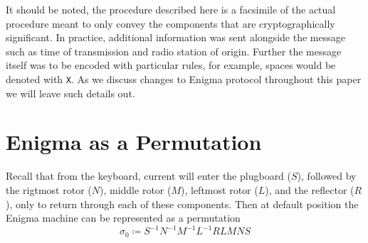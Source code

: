\noindent It should be noted, the procedure described here is a
facsimile of the actual procedure meant to only convey the components
that are cryptographically significant. In practice, additional
information was sent alongside the message such as time of
transmission and radio station of origin. Further the message itself
was to be encoded with particular rules, for example, spaces would be
denoted with \texttt{X}. As we discuss changes to Enigma protocol
throughout this paper we will leave such details out.


\section{Enigma as a Permutation}

Recall that from the keyboard, current will enter the plugboard
($S$), followed by the rigtmost rotor ($N$), middle
rotor ($M$), leftmost rotor ($L$), and the reflector ($R$), only to
return through each of these components. Then at default position the
Enigma machine can be represented as a permutation
\[
  \sigma_0 \coloneq S^{-1}N^{-1}M^{-1}L^{-1}RLMNS
\]

